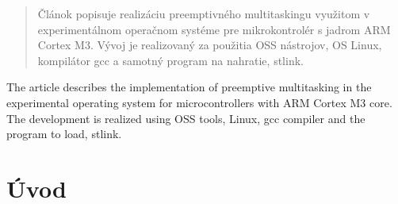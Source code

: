 \documentclass[twoside]{oss-conf}
\begin{document}

\begin{abstract}
Článok popisuje realizáciu preemptivného multitaskingu využitom v experimentálnom operačnom systéme pre mikrokontrolér s jadrom ARM Cortex M3. Vývoj je realizovaný za použitia OSS nástrojov,  OS Linux, kompilátor gcc a samotný program na nahratie, stlink. 
\end{abstract}



\begin{abstractA}
The article describes the implementation of preemptive multitasking in the experimental operating system for microcontrollers with ARM Cortex M3 core. The development is realized using OSS tools, Linux, gcc compiler and the program to load, stlink.
\end{abstractA}



\newtheorem{theorem}{Veta}[section]
\newtheorem{corollary}[theorem]{Tvrdenie}
\newtheorem{lemma}[theorem]{Lema}
\newtheorem{exmple}[theorem]{Príklad}
\newtheorem{defn}[theorem]{Definícia}
\newtheorem{rmrk}[theorem]{Poznámka}
\newenvironment{definition}{\begin{defn}\normalfont}{\end{defn}}
\newenvironment{remark}{\begin{rmrk}\normalfont}{\end{rmrk}}
\newenvironment{example}{\begin{exmple}\normalfont}{\end{exmple}}
\newtheorem*{remarque}{Poznámka}

\newcommand\dd{\mathop{\rm d\!}\nolimits}
\newcommand\sgn{\mathop{\rm sgn}\nolimits}
\renewcommand{\labelitemi}{$-$}


\maketitle

\section*{Úvod}
\end{document}
